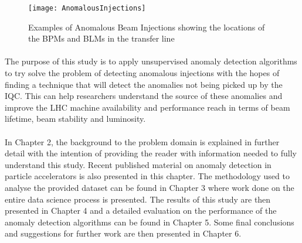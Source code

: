 \begin{figure}[t]
	\centering
	\texttt{[image: AnomalousInjections]}
	\caption[Anomalous Injections]{Examples of Anomalous Beam Injections showing the locations of the BPMs and BLMs in the transfer line}
	\label{fig::AnomalousInjections}
\end{figure}

\paragraph{ }The purpose of this study is to apply unsupervised anomaly detection algorithms to try solve the problem of detecting anomalous injections with the hopes of finding a technique that will detect the anomalies not being picked up by the \acs{IQC}. This can help researchers understand the source of these anomalies and improve the \acs{LHC} machine availability and performance reach in terms of beam lifetime, beam stability and luminosity.

\paragraph{ }In Chapter 2, the background to the problem domain is explained in further detail with the intention of providing the reader with information needed to fully understand this study. Recent published material on anomaly detection in particle accelerators is also presented in this chapter. The methodology used to analyse the provided dataset can be found in Chapter 3 where work done on the entire data science process is presented. The results of this study are then presented in Chapter 4 and a detailed evaluation on the performance of the anomaly detection algorithms can be found in Chapter 5. Some final conclusions and suggestions for further work are then presented in Chapter 6.